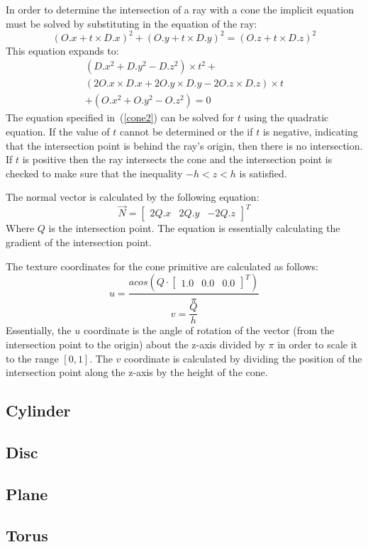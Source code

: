 In order to determine the intersection of a ray with a cone the implicit
equation must be solved by substituting in the equation of the ray:
\begin{equation}
  (O.x + t\times D.x)^2 + (O.y + t\times D.y)^2 = (O.z + t\times D.z)^2\label{cone1}
\end{equation}
This equation expands to:
\begin{equation}
\begin{split}
  (D.x^2 + D.y^2 - D.z^2)\times t^2 + \\
  (2O.x\times D.x + 2O.y\times D.y - 2O.z\times D.z)\times t \\
  + (O.x^2 + O.y^2 - O.z^2) = 0\label{cone2}
\end{split}
\end{equation}
The equation specified in~(\ref{cone2}) can be solved for $t$ using the
quadratic equation. If the value of $t$ cannot be determined or the if $t$ is
negative, indicating that the intersection point is behind the ray's origin,
then there is no intersection. If $t$ is positive then the ray intersects the
cone and the intersection point is checked to make sure that the inequality $-h
< z < h$ is satisfied.

The normal vector is calculated by the following equation:
\begin{equation}
  \vec{N} = \begin{bmatrix} 2Q.x & 2Q.y & -2Q.z
  \end{bmatrix}^{T}
\end{equation}
Where $Q$ is the intersection point. The equation is essentially calculating the
gradient of the intersection point.

The texture coordinates for the cone primitive are calculated as follows:
\begin{equation}
  u = \frac{acos(Q \cdot \begin{bmatrix} 1.0 & 0.0 & 0.0 \end{bmatrix}^{T})}{\pi}
\end{equation}
\begin{equation}
  v = \frac{Q}{h}
\end{equation}
Essentially, the $u$ coordinate is the angle of rotation of the vector (from
the intersection point to the origin) about the z-axis divided by $\pi$ in 
order to scale it to the range $[0, 1]$. The $v$ coordinate is calculated by
dividing the position of the intersection point along the z-axis by the height
of the cone.

\subsection*{Cylinder}

\subsection*{Disc}

\subsection*{Plane}

\subsection*{Torus}

